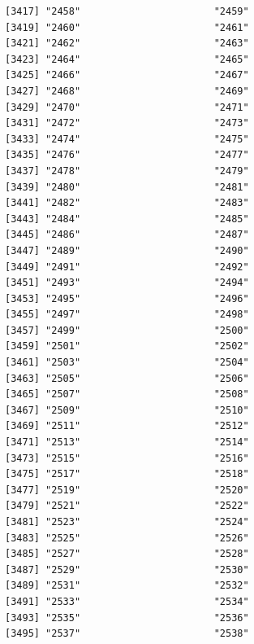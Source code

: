 \documentclass[
  letterpaper,
  DIV=11,
  numbers=noendperiod]{scrreprt}
\begin{document}
\begin{verbatim}
[3417] "2458"                       "2459"                      
[3419] "2460"                       "2461"                      
[3421] "2462"                       "2463"                      
[3423] "2464"                       "2465"                      
[3425] "2466"                       "2467"                      
[3427] "2468"                       "2469"                      
[3429] "2470"                       "2471"                      
[3431] "2472"                       "2473"                      
[3433] "2474"                       "2475"                      
[3435] "2476"                       "2477"                      
[3437] "2478"                       "2479"                      
[3439] "2480"                       "2481"                      
[3441] "2482"                       "2483"                      
[3443] "2484"                       "2485"                      
[3445] "2486"                       "2487"                      
[3447] "2489"                       "2490"                      
[3449] "2491"                       "2492"                      
[3451] "2493"                       "2494"                      
[3453] "2495"                       "2496"                      
[3455] "2497"                       "2498"                      
[3457] "2499"                       "2500"                      
[3459] "2501"                       "2502"                      
[3461] "2503"                       "2504"                      
[3463] "2505"                       "2506"                      
[3465] "2507"                       "2508"                      
[3467] "2509"                       "2510"                      
[3469] "2511"                       "2512"                      
[3471] "2513"                       "2514"                      
[3473] "2515"                       "2516"                      
[3475] "2517"                       "2518"                      
[3477] "2519"                       "2520"                      
[3479] "2521"                       "2522"                      
[3481] "2523"                       "2524"                      
[3483] "2525"                       "2526"                      
[3485] "2527"                       "2528"                      
[3487] "2529"                       "2530"                      
[3489] "2531"                       "2532"                      
[3491] "2533"                       "2534"                      
[3493] "2535"                       "2536"                      
[3495] "2537"                       "2538"                      

\end{verbatim}
\end{document}
